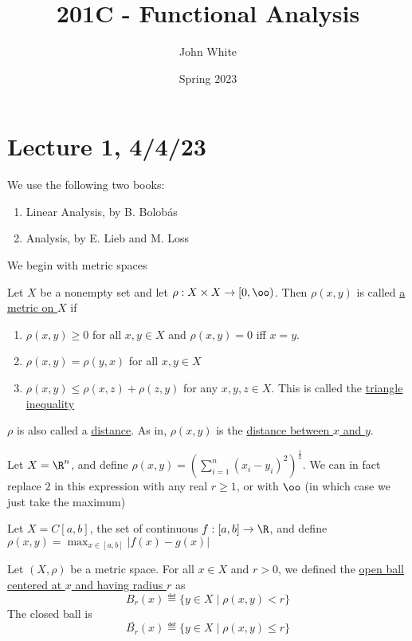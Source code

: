 \documentclass[x11names,reqno,14pt]{extarticle}
\title{201C - Functional Analysis}
\author{John White}
\date{Spring 2023}
\begin{document}
\section*{Lecture 1, 4/4/23}

We use the following two books:

\begin{enumerate}

\item Linear Analysis, by B. Bolob\'as 

\item Analysis, by E. Lieb and M. Loss

\end{enumerate}

We begin with metric spaces


Let $X$ be a nonempty set and let $\rho:X\times X\to[0,\oo)$. Then $\rho(x, y)$ is called \underline{a metric on $X$} if 

\begin{enumerate}[label=(\roman*)]

\item $\rho(x, y) \geq 0$ for all $x, y \in X$ and $\rho(x, y) = 0$ iff $x = y$. 

\item $\rho(x, y) = \rho(y, x)$ for all $x, y \in X$

\item $\rho(x, y) \leq \rho(x, z) + \rho(z, y)$ for any $x, y, z \in X$. This is called the \underline{triangle inequality}

\end{enumerate}

$\rho$ is also called a \underline{distance}. As in, $\rho(x, y)$ is the \underline{distance between $x$ and $y$}. 

\exm

Let $X = \R^n$, and define $\rho(x, y) = \left(\sum_{i=1}^n(x_i - y_i)^2\right)^{\frac{1}{2}}$. We can in fact replace $2$ in this expression with any real $r \geq 1$, or with $\oo$ (in which case we just take the maximum)

\exm

Let $X = C[a, b]$, the set of continuous $f:[a,b]\to\R$, and define $\rho(x, y) = \max_{x\in[a,b]}|f(x) - g(x)|$


Let $(X, \rho)$ be a metric space. For all $x \in X$ and $r > 0$, we defined the \underline{open ball centered at $x$ and having radius $r$} as
\[
B_r(x) \eqdef \{ y \in X \mid \rho(x, y) < r\}
\]
The closed ball is
\[
\bar{B_r}(x) \eqdef \{y \in X \mid \rho(x, y) \leq r\}
\]
\end{document}
